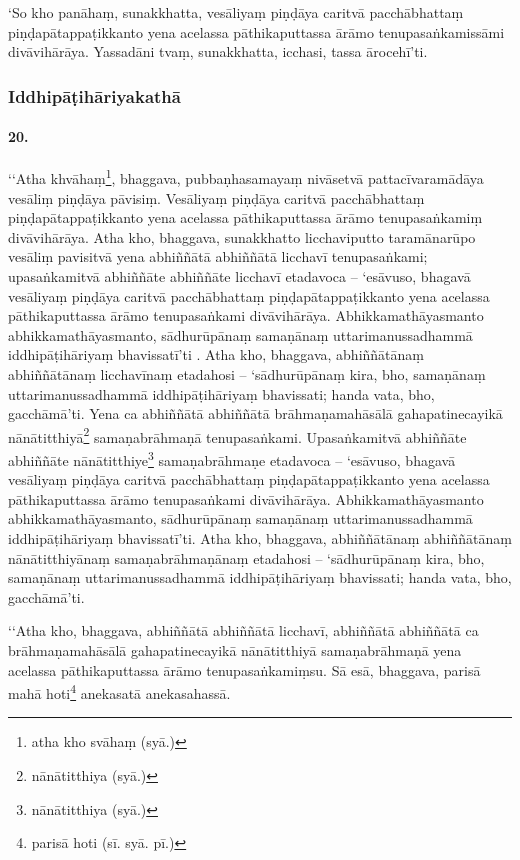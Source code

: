 ‘So kho panāhaṃ, sunakkhatta, vesāliyaṃ piṇḍāya caritvā pacchābhattaṃ piṇḍapātappaṭikkanto yena acelassa pāthikaputtassa ārāmo tenupasaṅkamissāmi divāvihārāya. Yassadāni tvaṃ, sunakkhatta, icchasi, tassa ārocehī’ti.

\subsubsection{Iddhipāṭihāriyakathā}

\paragraph{20.} ‘‘Atha khvāhaṃ\footnote{atha kho svāhaṃ (syā.)}, bhaggava, pubbaṇhasamayaṃ nivāsetvā pattacīvaramādāya vesāliṃ piṇḍāya pāvisiṃ. Vesāliyaṃ piṇḍāya caritvā pacchābhattaṃ piṇḍapātappaṭikkanto yena acelassa pāthikaputtassa ārāmo tenupasaṅkamiṃ divāvihārāya. Atha kho, bhaggava, sunakkhatto licchaviputto taramānarūpo vesāliṃ pavisitvā yena abhiññātā abhiññātā licchavī tenupasaṅkami; upasaṅkamitvā abhiññāte abhiññāte licchavī etadavoca – ‘esāvuso, bhagavā vesāliyaṃ piṇḍāya caritvā pacchābhattaṃ piṇḍapātappaṭikkanto yena acelassa pāthikaputtassa ārāmo tenupasaṅkami divāvihārāya. Abhikkamathāyasmanto abhikkamathāyasmanto, sādhurūpānaṃ samaṇānaṃ uttarimanussadhammā iddhipāṭihāriyaṃ bhavissatī’ti . Atha kho, bhaggava, abhiññātānaṃ abhiññātānaṃ licchavīnaṃ etadahosi – ‘sādhurūpānaṃ kira, bho, samaṇānaṃ uttarimanussadhammā iddhipāṭihāriyaṃ bhavissati; handa vata, bho, gacchāmā’ti. Yena ca abhiññātā abhiññātā brāhmaṇamahāsālā gahapatinecayikā nānātitthiyā\footnote{nānātitthiya (syā.)} samaṇabrāhmaṇā tenupasaṅkami. Upasaṅkamitvā abhiññāte abhiññāte nānātitthiye\footnote{nānātitthiya (syā.)} samaṇabrāhmaṇe etadavoca – ‘esāvuso, bhagavā vesāliyaṃ piṇḍāya caritvā pacchābhattaṃ piṇḍapātappaṭikkanto yena acelassa pāthikaputtassa ārāmo tenupasaṅkami divāvihārāya. Abhikkamathāyasmanto abhikkamathāyasmanto, sādhurūpānaṃ samaṇānaṃ uttarimanussadhammā iddhipāṭihāriyaṃ bhavissatī’ti. Atha kho, bhaggava, abhiññātānaṃ abhiññātānaṃ nānātitthiyānaṃ samaṇabrāhmaṇānaṃ etadahosi – ‘sādhurūpānaṃ kira, bho, samaṇānaṃ uttarimanussadhammā iddhipāṭihāriyaṃ bhavissati; handa vata, bho, gacchāmā’ti.

‘‘Atha kho, bhaggava, abhiññātā abhiññātā licchavī, abhiññātā abhiññātā ca brāhmaṇamahāsālā gahapatinecayikā nānātitthiyā samaṇabrāhmaṇā yena acelassa pāthikaputtassa ārāmo tenupasaṅkamiṃsu. Sā esā, bhaggava, parisā mahā hoti\footnote{parisā hoti (sī. syā. pī.)} anekasatā anekasahassā.

